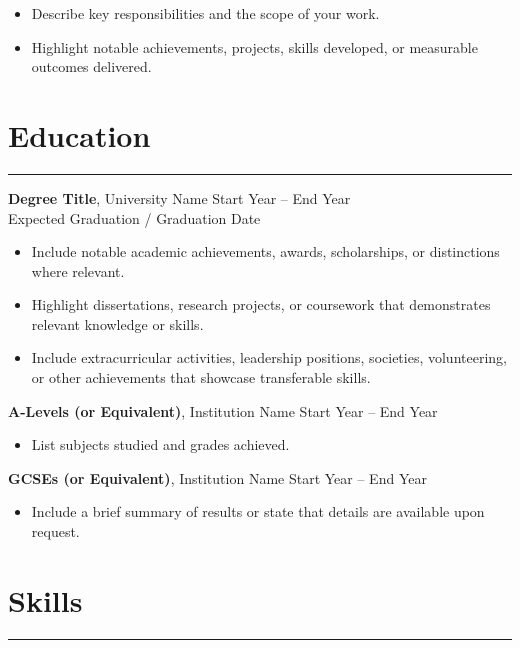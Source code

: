 \documentclass[12pt,a4paper]{report}
\newcommand{\resumeItem}[1]{\item #1}
\newcommand{\resumeSection}[1]{\section*{\Large\bfseries #1}\vspace{-0.5em}\hrule\vspace{0.2em}}
\begin{document}
\begin{itemize}[leftmargin=*]
    \resumeItem{Describe key responsibilities and the scope of your work.}
    
    \resumeItem{Highlight notable achievements, projects, skills developed,
    or measurable outcomes delivered.}
\end{itemize}

\pagebreak

\resumeSection{Education}

\textbf{Degree Title}, University Name \hfill Start Year -- End Year\\
Expected Graduation / Graduation Date

\begin{itemize}
    \item Include notable academic achievements, awards, scholarships, or
          distinctions where relevant.
    \item Highlight dissertations, research projects, or coursework that
          demonstrates relevant knowledge or skills.
    \item Include extracurricular activities, leadership positions, societies,
          volunteering, or other achievements that showcase transferable skills.
\end{itemize}

\vspace{1em}

\textbf{A-Levels (or Equivalent)}, Institution Name \hfill Start Year -- End Year

\begin{itemize}
    \item List subjects studied and grades achieved.
\end{itemize}

\vspace{1em}

\textbf{GCSEs (or Equivalent)}, Institution Name \hfill Start Year -- End Year

\begin{itemize}
    \item Include a brief summary of results or state that details are available
          upon request.
\end{itemize}


\resumeSection{Skills}
\end{document}
